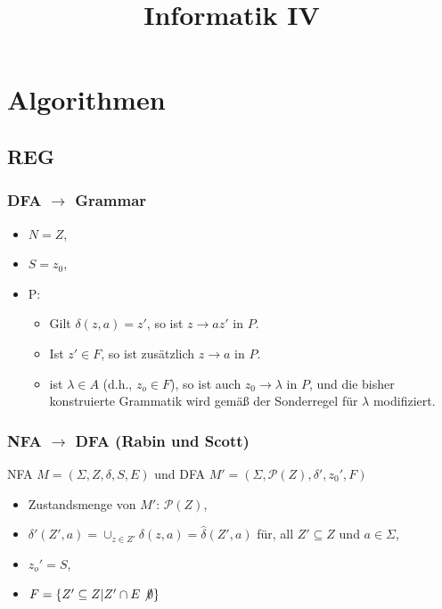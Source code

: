 \documentclass[9pt, a4paper]{article}
\title{Informatik IV}
\author{}
\begin{document}
\tableofcontents
\newpage
{}
\section{Algorithmen}
\subsection{REG}
\subsubsection{DFA $\to$ Grammar}
	\begin{itemize}
		\item $N = Z$,
		\item $S = z_0$,
		\item P:
		\begin{itemize}
			\item Gilt $\delta(z, a) = z'$, so ist $z \rightarrow az'$ in $P$.
			\item Ist $z' \in F$, so ist zusätzlich $z \rightarrow a$ in $P$.
			\item ist $\lambda \in A$ (d.h., $z_o \in F$), so ist auch $z_0 \rightarrow \lambda$ in $P$, und die bisher konstruierte Grammatik wird gemäß der Sonderregel für $\lambda$ modifiziert.
		\end{itemize}
	\end{itemize}

\subsubsection{NFA $\to$ DFA (Rabin und Scott)}
NFA $M = (\Sigma, Z, \delta, S, E)$ und DFA $M' = (\Sigma, \mathcal{P}(Z), \delta', z_0', F)$
\begin{itemize}
	\item Zustandsmenge von $M'$: $\mathcal{P}(Z)$,
	\item $\delta'(Z', a)= \cup_{z\in Z'}\delta(z, a)=\hat\delta(Z', a)$ für, all $Z' \subseteq Z$ und $a \in \Sigma$,
	\item $z_o' = S$,
	\item $F = \{Z' \subseteq Z | Z' \cap E \not \emptyset\}$
\end{itemize}
\end{document}
